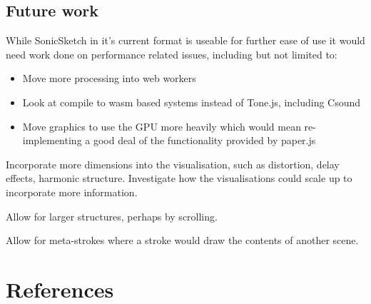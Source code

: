 \documentclass[a4paper,12pt]{article}
\begin{document}
\subsection{Future work}
\label{sec:orgbece159}
While SonicSketch in it's current format is useable for further ease of use it
would need work done on performance related issues, including but not limited
to: 
\begin{itemize}
\item Move more processing into web workers
\item Look at compile to wasm based systems instead of Tone.js, including Csound
\item Move graphics to use the GPU more heavily which would mean re-implementing a
good deal of the functionality provided by paper.js
\end{itemize}

Incorporate more dimensions into the visualisation, such as distortion, delay
effects, harmonic structure. Investigate how the visualisations could scale up
to incorporate more information.

Allow for larger structures, perhaps by scrolling.

Allow for meta-strokes where a stroke would draw the contents of another scene.

\section{References}
\label{sec:orgec81d9a}
\end{document}
